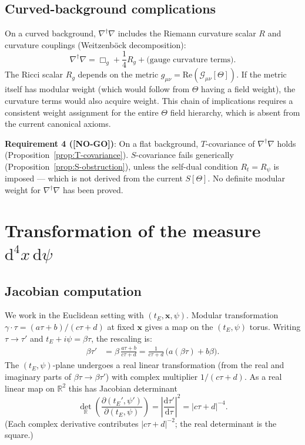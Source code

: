 \documentclass[12pt,a4paper]{article}
\theoremstyle{definition}
\theoremstyle{remark}
\newcommand{\NOGO}{\textcolor{red!80!black}{\textbf{[NO-GO]}}}
\newcommand{\RR}{\mathbb{R}}
\newcommand{\dd}{\mathrm{d}}
\newcommand{\Real}{\mathrm{Re}}
\begin{document}
\subsection{Curved-background complications}

On a curved background, $\nabla^\dagger\nabla$ includes the Riemann curvature
scalar $R$ and curvature couplings (Weitzenböck decomposition):
\begin{equation}
  \nabla^\dagger\nabla
  = \Box_g + \frac{1}{4}R_g + \text{(gauge curvature terms)}.
\end{equation}
The Ricci scalar $R_g$ depends on the metric $g_{\mu\nu}=\Real(\mathcal G_{\mu\nu}[\Theta])$.
If the metric itself has modular weight (which would follow from $\Theta$ having
a field weight), the curvature terms would also acquire weight.  This chain of
implications requires a consistent weight assignment for the entire $\Theta$
field hierarchy, which is absent from the current canonical axioms.

\begin{resultbox}
\textbf{Requirement 4 (\NOGO)}: On a flat background, $T$-covariance of
$\nabla^\dagger\nabla$ holds (Proposition~\ref{prop:T-covariance}).
$S$-covariance fails generically (Proposition~\ref{prop:S-obstruction}),
unless the self-dual condition $R_t=R_\psi$ is imposed — which is not derived
from the current $S[\Theta]$.  No definite modular weight for
$\nabla^\dagger\nabla$ has been proved.
\end{resultbox}

\section{Transformation of the measure $\dd^4x\,\dd\psi$}
\label{sec:measure}

\subsection{Jacobian computation}

We work in the Euclidean setting with $(t_E,\mathbf x,\psi)$.
Modular transformation $\gamma\cdot\tau=(a\tau+b)/(c\tau+d)$ at fixed
$\mathbf x$ gives a map on the $(t_E,\psi)$ torus.  Writing
$\tau\to\tau'$ and $t_E+i\psi = \beta\tau$, the rescaling is:
\begin{align}
  \beta\tau'
  &= \beta\,\frac{a\tau+b}{c\tau+d}
  = \frac{1}{c\tau+d}\,\bigl(a(\beta\tau)+b\beta\bigr).
\end{align}
The $(t_E,\psi)$-plane undergoes a real linear transformation
(from the real and imaginary parts of $\beta\tau\to\beta\tau'$) with
complex multiplier $1/(c\tau+d)$.  As a real linear map on $\RR^2$ this
has Jacobian determinant
\begin{equation}
  \det_\RR\!\left(\frac{\partial(t_E',\psi')}{\partial(t_E,\psi)}\right)
  = \left|\frac{\dd\tau'}{\dd\tau}\right|^2
  = |c\tau+d|^{-4}.
  \label{eq:jacobian-2d}
\end{equation}
(Each complex derivative contributes $|c\tau+d|^{-2}$; the real determinant
is the square.)
\end{document}
